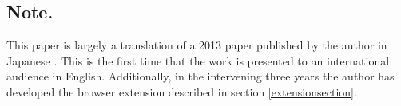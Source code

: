\documentclass[runningheads,a4paper]{llncs}
\begin{document}
%
%

\subsection*{Note.}

This paper is largely a translation of a 2013 paper published by the
author in Japanese \cite{WISS2013}. This is the first time that the
work is presented to an international audience in English.
Additionally, in the intervening three years the author has
developed the browser extension described in section \ref{extensionsection}.







\end{document}
